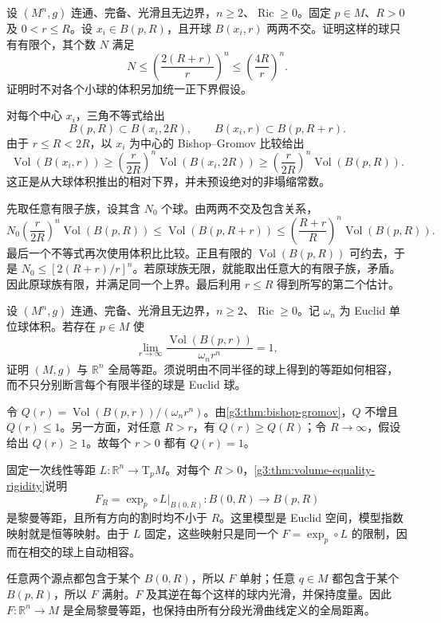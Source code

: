 \begin{exercise}\label{g3:ex:volume-comparison-packing}
	设 \((M^n,g)\) 连通、完备、光滑且无边界，\(n\ge2\)、\(\operatorname{Ric}\ge0\)。固定 \(p\in M\)、\(R>0\) 及 \(0<r\le R\)。设 \(x_i\in B(p,R)\)，且开球 \(B(x_i,r)\) 两两不交。证明这样的球只有有限个，其个数 \(N\) 满足
	\[
		N\le\left(\frac{2(R+r)}r\right)^n
		\le\left(\frac{4R}r\right)^n.
	\]
	证明时不对各个小球的体积另加统一正下界假设。
\end{exercise}
\begin{solution}
	对每个中心 \(x_i\)，三角不等式给出
	\[
		B(p,R)\subset B(x_i,2R),\qquad
		B(x_i,r)\subset B(p,R+r).
	\]
	由于 \(r\le R<2R\)，以 \(x_i\) 为中心的 Bishop--Gromov 比较给出
	\[
		\operatorname{Vol}(B(x_i,r))
		\ge\left(\frac r{2R}\right)^n\operatorname{Vol}(B(x_i,2R))
		\ge\left(\frac r{2R}\right)^n\operatorname{Vol}(B(p,R)).
	\]
	这正是从大球体积推出的相对下界，并未预设绝对的非塌缩常数。

	先取任意有限子族，设其含 \(N_0\) 个球。由两两不交及包含关系，
	\[
		N_0\left(\frac r{2R}\right)^n\operatorname{Vol}(B(p,R))
		\le\operatorname{Vol}(B(p,R+r))
		\le\left(\frac{R+r}R\right)^n\operatorname{Vol}(B(p,R)).
	\]
	最后一个不等式再次使用体积比比较。正且有限的 \(\operatorname{Vol}(B(p,R))\) 可约去，于是
	\(N_0\le[2(R+r)/r]^n\)。若原球族无限，就能取出任意大的有限子族，矛盾。因此原球族有限，并满足同一个上界。最后利用 \(r\le R\) 得到所写的第二个估计。
\end{solution}

\begin{exercise}\label{g3:ex:euclidean-asymptotic-volume-rigidity}
	设 \((M^n,g)\) 连通、完备、光滑且无边界，\(n\ge2\)、\(\operatorname{Ric}\ge0\)。记 \(\omega_n\) 为 Euclid 单位球体积。若存在 \(p\in M\) 使
	\[
		\lim_{r\to\infty}\frac{\operatorname{Vol}(B(p,r))}{\omega_n r^n}=1,
	\]
	证明 \((M,g)\) 与 \(\mathbb R^n\) 全局等距。须说明由不同半径的球上得到的等距如何相容，而不只分别断言每个有限半径的球是 Euclid 球。
\end{exercise}
\begin{solution}
	令 \(Q(r)=\operatorname{Vol}(B(p,r))/(\omega_n r^n)\)。由\cref{g3:thm:bishop-gromov}，\(Q\) 不增且 \(Q(r)\le1\)。另一方面，对任意 \(R>r\)，有 \(Q(r)\ge Q(R)\)；令 \(R\to\infty\)，假设给出 \(Q(r)\ge1\)。故每个 \(r>0\) 都有 \(Q(r)=1\)。

	固定一次线性等距 \(L:\mathbb R^n\to\mathrm T_pM\)。对每个 \(R>0\)，\cref{g3:thm:volume-equality-rigidity}说明
	\[
		F_R=\exp_p\circ L\big|_{B(0,R)}:B(0,R)\longrightarrow B(p,R)
	\]
	是黎曼等距，且所有方向的割时均不小于 \(R\)。这里模型是 Euclid 空间，模型指数映射就是恒等映射。由于 \(L\) 固定，这些映射只是同一个 \(F=\exp_p\circ L\) 的限制，因而在相交的球上自动相容。

	任意两个源点都包含于某个 \(B(0,R)\)，所以 \(F\) 单射；任意 \(q\in M\) 都包含于某个 \(B(p,R)\)，所以 \(F\) 满射。\(F\) 及其逆在每个这样的球内光滑，并保持度量。因此 \(F:\mathbb R^n\to M\) 是全局黎曼等距，也保持由所有分段光滑曲线定义的全局距离。
\end{solution}

